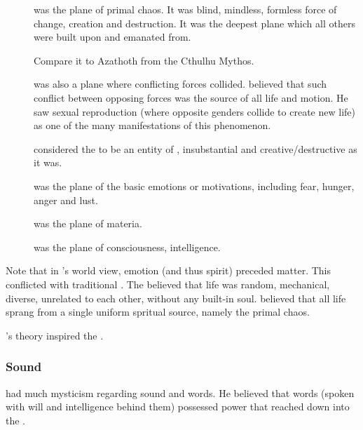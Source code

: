 \begin{description}
  \item[\DaathKurZulNathla] was the plane of primal chaos. 
    It was blind, mindless, formless force of change, creation and destruction.
    It was the deepest plane which all others were built upon and emanated from. 
    
    Compare it to Azathoth from the Cthulhu Mythos. 
    
    \DaathKurZulNathla was also a plane where conflicting forces collided.
    \Sethicus believed that such conflict between opposing forces was the source of all life and motion.
    He saw sexual reproduction (where opposite genders collide to create new life) as one of the many manifestations of this phenomenon. 
    
    \Sethicus considered the \noggyal {} to be an entity of \DaathKurZulNathla, insubstantial and creative/destructive as it was. 
  
  \item[\Osserylloch] was the plane of the basic emotions or motivations, including fear, hunger, anger and lust. 
    
  \item[\Barbeloth] was the plane of materia. 
  
  \item[\YothUnXachtyon] was the plane of consciousness, intelligence. 
\end{description}

Note that in \Sethicus's world view, emotion (and thus spirit) preceded matter. 
This conflicted with traditional . 
The \ophidians believed that life was random, mechanical, diverse, unrelated to each other, without any built-in soul. 
\Sethicus believed that all life sprang from a single uniform spritual source, namely the primal chaos. 

\Sethicus's theory inspired the .






\subsubsection{Sound}
\Sethicus had much mysticism regarding sound and words. 
He believed that words (spoken with will and intelligence behind them) possessed power that reached down into the . 

